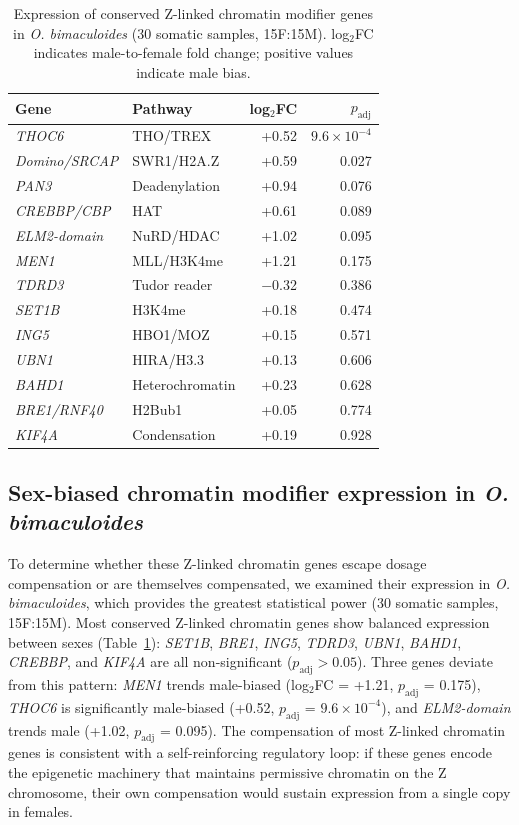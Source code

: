 \documentclass[12pt]{article}
\begin{document}
\begin{table}[tbp]
\centering
\caption{Expression of conserved Z-linked chromatin modifier genes
in \textit{O. bimaculoides} (30 somatic samples, 15F:15M).
log$_2$FC indicates male-to-female fold change; positive values indicate male bias.}
\label{tab:compass}
\vspace{0.5em}
\begin{tabular}{llrr}
\toprule
\textbf{Gene} & \textbf{Pathway} & \textbf{log$_2$FC} & \textbf{$p_\text{adj}$} \\
\midrule
\textit{THOC6} & THO/TREX & +0.52 & $9.6 \times 10^{-4}$ \\
\textit{Domino/SRCAP} & SWR1/H2A.Z & +0.59 & 0.027 \\
\textit{PAN3} & Deadenylation & +0.94 & 0.076 \\
\textit{CREBBP/CBP} & HAT & +0.61 & 0.089 \\
\textit{ELM2-domain} & NuRD/HDAC & +1.02 & 0.095 \\
\textit{MEN1} & MLL/H3K4me & +1.21 & 0.175 \\
\textit{TDRD3} & Tudor reader & $-$0.32 & 0.386 \\
\textit{SET1B} & H3K4me & +0.18 & 0.474 \\
\textit{ING5} & HBO1/MOZ & +0.15 & 0.571 \\
\textit{UBN1} & HIRA/H3.3 & +0.13 & 0.606 \\
\textit{BAHD1} & Heterochromatin & +0.23 & 0.628 \\
\textit{BRE1/RNF40} & H2Bub1 & +0.05 & 0.774 \\
\textit{KIF4A} & Condensation & +0.19 & 0.928 \\
\bottomrule
\end{tabular}
\end{table}

\subsection*{Sex-biased chromatin modifier expression in \textit{O. bimaculoides}}

To determine whether these Z-linked chromatin genes escape dosage compensation
or are themselves compensated,
we examined their expression in \textit{O. bimaculoides},
which provides the greatest statistical power
(30 somatic samples, 15F:15M).
Most conserved Z-linked chromatin genes show balanced expression
between sexes (Table~\ref{tab:compass}):
\textit{SET1B}, \textit{BRE1}, \textit{ING5}, \textit{TDRD3}, \textit{UBN1}, \textit{BAHD1}, \textit{CREBBP}, and \textit{KIF4A}
are all non-significant ($p_\text{adj} > 0.05$).
Three genes deviate from this pattern:
\textit{MEN1} trends male-biased (log$_2$FC = +1.21, $p_\text{adj}$ = 0.175),
\textit{THOC6} is significantly male-biased
(+0.52, $p_\text{adj}$ = $9.6 \times 10^{-4}$),
and \textit{ELM2-domain} trends male (+1.02, $p_\text{adj}$ = 0.095).
The compensation of most Z-linked chromatin genes is consistent with
a self-reinforcing regulatory loop:
if these genes encode the epigenetic machinery
that maintains permissive chromatin on the Z chromosome,
their own compensation would sustain expression from a single copy in females.
\end{document}
